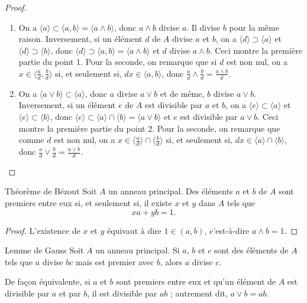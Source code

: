 \documentclass[]{report}
\begin{document}
\begin{proof}
    \begin{enumerate}
        \item On a $\langle a \rangle \subset \langle a, b \rangle = \langle a \wedge b \rangle$, donc $a \wedge b$ divise $a$. Il divise $b$ pour la même raison. Inversement, si un élément $d$ de $A$ divise $a$ et $b$, on a $\langle d \rangle \supset \langle a \rangle$ et $\langle d \rangle \supset \langle b \rangle$, donc $\langle d \rangle \supset \langle a, b \rangle = \langle a \wedge b \rangle$ et $d$ divise $a \wedge b$. Ceci montre la première partie du point 1. Pour la seconde, on remarque que si $d$ est non nul, on a $x \in \langle \frac{a}{d}, \frac{b}{d} \rangle$ si, et seulement si, $dx \in \langle a, b \rangle$, donc $\frac{a}{d} \wedge \frac{b}{d} = \frac{a \wedge b}{d}$.
        \item On a $\langle a \vee b \rangle \subset \langle a \rangle$, donc $a$ divise $a \vee b$ et de même, $b$ divise $a \vee b$. Inversement, si un élément $e$ de $A$ est divisible par $a$ et $b$, on a $\langle e \rangle \subset \langle a \rangle$ et $\langle e \rangle \subset \langle b \rangle$, donc $\langle e \rangle \subset \langle a \rangle \cap \langle b \rangle = \langle a \vee b \rangle$ et $e$ est divisible par $a \vee b$. Ceci montre la première partie du point 2. Pour la seconde, on remarque que comme $d$ est non nul, on a $x \in \langle \frac{a}{d} \rangle \cap \langle \frac{b}{d} \rangle$ si, et seulement si, $dx \in \langle a \rangle \cap \langle b \rangle$, donc $\frac{a}{d} \vee \frac{b}{d} = \frac{a \vee b}{d}$.
    \end{enumerate}
\end{proof}

\begin{tm}{Théorème de Bézout}{}
    Soit $A$ un anneau principal. Des éléments $a$ et $b$ de $A$ sont premiers entre eux si, et seulement si, il existe $x$ et $y$ dans $A$ tels que
    \[xa + yb = 1.\]
\end{tm}

\begin{proof}
    L'existence de $x$ et $y$ équivaut à dire $1 \in (a, b)$, c'est-à-dire $a \wedge b = 1$.
\end{proof}

\begin{prop}{Lemme de Gauss}{}
    Soit $A$ un anneau principal. Si $a$, $b$ et $c$ sont des éléments de $A$ tels que $a$ divise $bc$ mais est premier avec $b$, alors $a$ divise $c$.

    De façon équivalente, si $a$ et $b$ sont premiers entre eux et qu'un élément de $A$ est divisible par $a$ et par $b$, il est divisible par $ab$ ; autrement dit, $a \vee b = ab$.
\end{prop}
\end{document}
